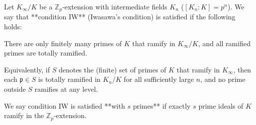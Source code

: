 Let $K_\infty / K$ be a $\mathbb{Z}_p$-extension with intermediate fields $K_n$ ($[K_n : K] = p^n$). We say that **condition IW** (Iwasawa's condition) is satisfied if the following holds:

There are only finitely many primes of $K$ that ramify in $K_\infty / K$, and all ramified primes are totally ramified.

Equivalently, if $S$ denotes the (finite) set of primes of $K$ that ramify in $K_\infty$, then each $\mathfrak{p} \in S$ is totally ramified in $K_n/K$ for all sufficiently large $n$, and no prime outside $S$ ramifies at any level.

We say condition IW is satisfied **with $s$ primes** if exactly $s$ prime ideals of $K$ ramify in the $\mathbb{Z}_p$-extension.
